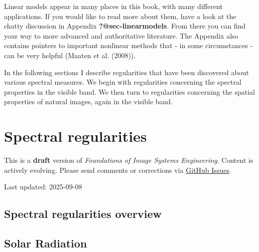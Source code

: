 \documentclass[
  letterpaper,
]{book}
\begin{document}
Linear models appear in many places in this book, with many different
applications. If you would like to read more about them, have a look at
the chatty discussion in Appendix \textbf{?@sec-linearmodels}. From
there you can find your way to more advanced and authoritative
literature. The Appendix also contains pointers to important nonlinear
methods that - in some circumstances - can be very helpful (Maaten et
al. (2008)).

In the following sections I describe regularities that have been
discovered about various spectral measures. We begin with regularities
concerning the spectral properties in the visible band. We then turn to
regularities concerning the spatial properties of natural images, again
in the visible band.

\chapter{Spectral regularities}\label{sec-spectral-regularities}

\begin{tcolorbox}[enhanced jigsaw, colframe=quarto-callout-warning-color-frame, titlerule=0mm, rightrule=.15mm, opacitybacktitle=0.6, colback=white, leftrule=.75mm, coltitle=black, title=\textcolor{quarto-callout-warning-color}{\faExclamationTriangle}\hspace{0.5em}{Work in Progress}, bottomrule=.15mm, colbacktitle=quarto-callout-warning-color!10!white, breakable, left=2mm, bottomtitle=1mm, toptitle=1mm, opacityback=0, arc=.35mm, toprule=.15mm]

This is a \textbf{draft} version of \emph{Foundations of Image Systems
Engineering}. Content is actively evolving. Please send comments or
corrections via \href{https://github.com/wandell/FISE-git/issues}{GitHub
Issues}.

Last updated: 2025-09-08

\end{tcolorbox}

\section{Spectral regularities
overview}\label{sec-spectral-regularities-overview}

\section{Solar Radiation}\label{solar-radiation}
\end{document}
